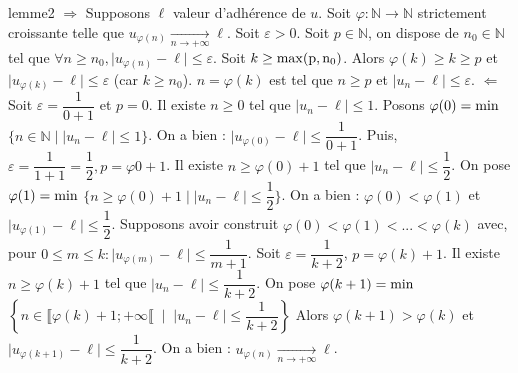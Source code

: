 \documentclass[12pt,a4paper]{report}
\begin{document}
\begin{demonstration}{lemme2}
$\Longrightarrow$ Supposons $\ell$ valeur d'adhérence de $u$. Soit $\varphi : \mathbb{N} \rightarrow \mathbb{N}$ strictement croissante telle que $u_{\varphi(n)} \xrightarrow[n \rightarrow +\infty]{} \ell$.
\newline Soit $\varepsilon > 0$. Soit $p \in \mathbb{N}$, on dispose de $n_0 \in \mathbb{N}$ tel que $\forall n \geq n_0, \lvert u_{\varphi(n)}-\ell \rvert \leq \varepsilon$.
\newline Soit $k \geq \rm{max}(p,n_0)$. Alors $\varphi(k) \geq k \geq p$ et $\lvert u_{\varphi(k)} - \ell \rvert \leq \varepsilon$ (car $k \geq n_0$).
\newline $n = \varphi(k)$ est tel que $n \geq p$ et $\lvert u_n -\ell \rvert \leq \varepsilon$.
\newline \newline $\Longleftarrow$ Soit $\varepsilon = \dfrac{1}{0+1}$ et $p=0$. Il existe $n \geq 0$ tel que $\lvert u_n - \ell \rvert \leq 1$. Posons $\varphi(0) = \rm{min}$ $\{ n \in \mathbb{N} \mid \lvert u_n - \ell \rvert \leq 1 \}$.
\newline On a bien : $\lvert u_{\varphi(0)} - \ell \rvert \leq \dfrac{1}{0+1}$.
\newline Puis, $\varepsilon = \dfrac{1}{1+1} = \dfrac{1}{2}, p = \varphi{0}+1$. Il existe $n \geq \varphi(0) +1$ tel que $\lvert u_n - \ell \rvert \leq \dfrac{1}{2}$.
\newline On pose $\varphi(1) = \rm{min}$ $\{ n \geq \varphi(0) +1 \mid \lvert u_n - \ell \rvert \leq \dfrac{1}{2} \}$.
\newline On a bien : $\varphi(0) < \varphi(1)$ et $\lvert u_{\varphi(1)} - \ell \rvert \leq \dfrac{1}{2}$.
\newline \newline Supposons avoir construit $\varphi(0) < \varphi(1) < ... < \varphi(k)$ avec, pour $0 \leq m \leq k : \lvert u_{\varphi(m)} - \ell \rvert \leq \dfrac{1}{m+1}$.
\newline Soit $\varepsilon = \dfrac{1}{k+2}$, $p=\varphi(k)+1$. Il existe $n \geq \varphi(k)+1$ tel que $\lvert u_n - \ell \rvert \leq \dfrac{1}{k+2}$.
\newline On pose $\varphi(k+1) = \rm{min}$ $\left \{ n \in \llbracket \varphi(k)+1 ; +\infty \llbracket \; \mid  \; \lvert u_n - \ell \rvert \leq \dfrac{1}{k+2} \right \}$
\newline Alors $\varphi(k+1) > \varphi(k)$ et $\lvert u_{\varphi(k+1)} - \ell \rvert \leq \dfrac{1}{k+2}$. On a bien : $u_{\varphi(n)} \xrightarrow[n \rightarrow +\infty]{} \ell$.
\end{demonstration}
\end{document}
